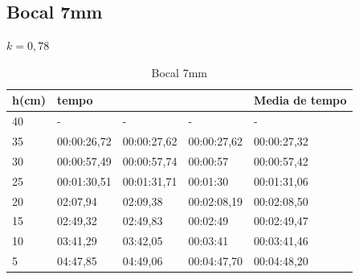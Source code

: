 \documentclass[12pt]{article}
\begin{document}
\subsection[short]{Bocal 7mm}
$ k = 0,78 $
\begin{table}[H]
    \begin{tabular}{|l|lll|l|}
        \hline
        h(cm) & tempo                            &                                  &             & Media de tempo \\ \hline
        40    & \multicolumn{1}{l|}{-}           & \multicolumn{1}{l|}{-}           & -           & -              \\ \hline
        35    & \multicolumn{1}{l|}{00:00:26,72} & \multicolumn{1}{l|}{00:00:27,62} & 00:00:27,62 & 00:00:27,32    \\ \hline
        30    & \multicolumn{1}{l|}{00:00:57,49} & \multicolumn{1}{l|}{00:00:57,74} & 00:00:57    & 00:00:57,42    \\ \hline
        25    & \multicolumn{1}{l|}{00:01:30,51} & \multicolumn{1}{l|}{00:01:31,71} & 00:01:30    & 00:01:31,06    \\ \hline
        20    & \multicolumn{1}{l|}{02:07,94}    & \multicolumn{1}{l|}{02:09,38}    & 00:02:08,19 & 00:02:08,50    \\ \hline
        15    & \multicolumn{1}{l|}{02:49,32}    & \multicolumn{1}{l|}{02:49,83}    & 00:02:49    & 00:02:49,47    \\ \hline
        10    & \multicolumn{1}{l|}{03:41,29}    & \multicolumn{1}{l|}{03:42,05}    & 00:03:41    & 00:03:41,46    \\ \hline
        5     & \multicolumn{1}{l|}{04:47,85}    & \multicolumn{1}{l|}{04:49,06}    & 00:04:47,70 & 00:04:48,20    \\ \hline
    \end{tabular}
    \caption{Bocal 7mm}
\end{table}
\end{document}
